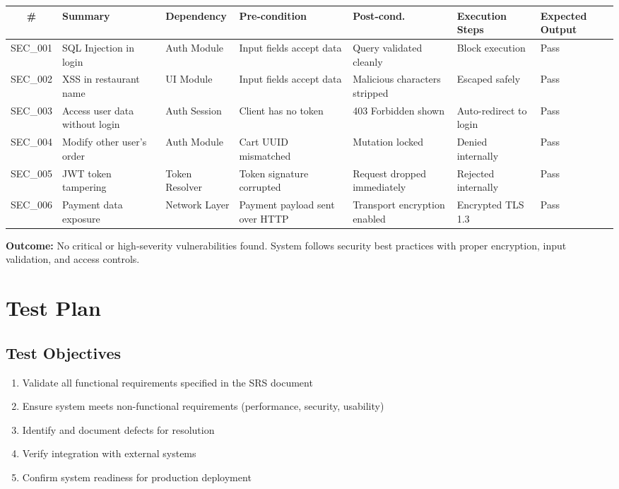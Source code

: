 \documentclass[12pt,a4paper]{report}
\begin{document}
\begin{longtable}{|c|p{1.8cm}|p{1.4cm}|p{1.8cm}|p{1.8cm}|p{2.2cm}|p{1.6cm}|}
\hline
\textbf{\#} & \textbf{Summary} & \textbf{Dependency} & \textbf{Pre-condition} & \textbf{Post-cond.} & \textbf{Execution Steps} & \textbf{Expected Output} \\
\hline
\endfirsthead
SEC\_001 & SQL Injection in login & Auth Module & Input fields accept data & Query validated cleanly & Block execution & Pass \\
\hline
SEC\_002 & XSS in restaurant name & UI Module & Input fields accept data & Malicious characters stripped & Escaped safely & Pass \\
\hline
SEC\_003 & Access user data without login & Auth Session & Client has no token & 403 Forbidden shown & Auto-redirect to login & Pass \\
\hline
SEC\_004 & Modify other user's order & Auth Module & Cart UUID mismatched & Mutation locked & Denied internally & Pass \\
\hline
SEC\_005 & JWT token tampering & Token Resolver & Token signature corrupted & Request dropped immediately & Rejected internally & Pass \\
\hline
SEC\_006 & Payment data exposure & Network Layer & Payment payload sent over HTTP & Transport encryption enabled & Encrypted TLS 1.3 & Pass \\
\hline
\end{longtable}

\textbf{Outcome:} No critical or high-severity vulnerabilities found. System follows security best practices with proper encryption, input validation, and access controls.

\chapter{Test Plan}

\section{Test Objectives}
\begin{enumerate}
    \item Validate all functional requirements specified in the SRS document
    \item Ensure system meets non-functional requirements (performance, security, usability)
    \item Identify and document defects for resolution
    \item Verify integration with external systems
    \item Confirm system readiness for production deployment
\end{enumerate}
\end{document}
